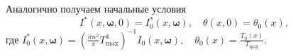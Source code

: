 Аналогично получаем начальные условия
\begin{equation}
    \label{eq:1_1:13}
    I^{*}(x, \boldsymbol{\omega}, 0)=I_{0}^{*}(x, \boldsymbol{\omega}),
    \quad \theta(x, 0)=\theta_{0}(x),
\end{equation}
где $I_{0}^{*}(x, \boldsymbol{\omega})=\left(\frac{\sigma n^{2}}{\pi}
T_{\max }^{4}\right)^{-1} I_{0}(x, \boldsymbol{\omega}),
\quad \theta_{0}(x)=\frac{T_{0}(x)}{T_{\max }}$.
